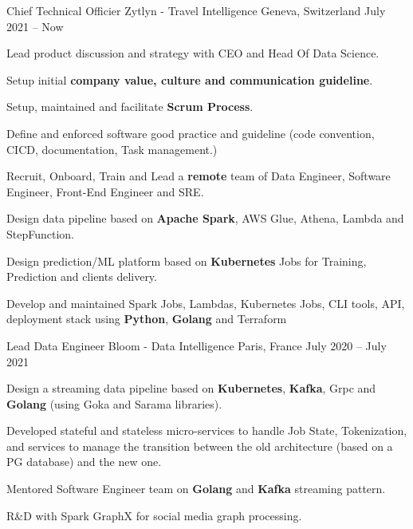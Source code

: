 

\begin{cventries}

\cventry
  {Chief Technical Officier} %
  {Zytlyn - Travel Intelligence} %
  {Geneva, Switzerland} %
  {July 2021 – Now} %
  {
    \begin{cvitems} %
      \item {Lead product discussion and strategy with CEO and Head Of Data Science.}
      \item {Setup initial \textbf{company value, culture and communication guideline}.}
      \item {Setup, maintained and facilitate \textbf{Scrum Process}.}
      \item {Define and enforced software good practice and guideline (code convention, CICD, documentation, Task management.)}
      \item {Recruit, Onboard, Train and Lead a \textbf{remote} team of Data Engineer, Software Engineer, Front-End Engineer and SRE.}
      \item {Design data pipeline based on \textbf{Apache Spark}, AWS Glue, Athena, Lambda and StepFunction.}
      \item {Design prediction/ML platform based on \textbf{Kubernetes} Jobs for Training, Prediction and clients delivery.}
      \item {Develop and maintained Spark Jobs, Lambdas, Kubernetes Jobs, CLI tools, API, deployment stack using \textbf{Python}, \textbf{Golang} and Terraform}
    \end{cvitems}
  }

\cventry
  {Lead Data Engineer} %
  {Bloom - Data Intelligence} %
  {Paris, France} %
  {July 2020 – July 2021} %
  {
    \begin{cvitems} %
      \item {Design a streaming data pipeline based on \textbf{Kubernetes}, \textbf{Kafka}, Grpc and \textbf{Golang} (using Goka and Sarama libraries).}
      \item {Developed stateful and stateless micro-services to handle Job State, Tokenization, and services to manage the transition between the old architecture (based on a PG database) and the new one.}
      \item {Mentored Software Engineer team on \textbf{Golang} and \textbf{Kafka} streaming pattern.}
      \item {R\&D with Spark GraphX for social media graph processing.}
    \end{cvitems}
  }


\end{cventries}
